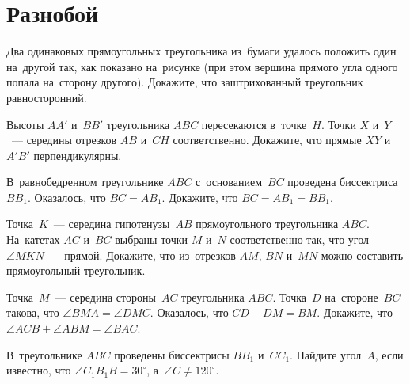 
\section*{Разнобой}


\begin{problems}

\item
Два одинаковых прямоугольных треугольника из~бумаги удалось положить один
на~другой так, как показано на~рисунке (при этом вершина прямого угла одного
попала на~сторону другого).
Докажите, что заштрихованный треугольник равносторонний.
\begin{center}
\end{center}

\item
Высоты $AA'$ и~$BB'$ треугольника $ABC$ пересекаются в~точке~$H$.
Точки $X$ и~$Y$~--- середины отрезков $AB$ и~$CH$ соответственно.
Докажите, что прямые $XY$ и~$A'B'$ перпендикулярны.

\item
В~равнобедренном треугольнике $ABC$ с~основанием~$BC$ проведена
биссектриса~$B B_1$.
Оказалось, что $B C = A B_1$.
Докажите, что $B C = A B_1 = B B_1$.

\item
Точка~$K$~--- середина гипотенузы~$AB$ прямоугольного треугольника $ABC$.
На~катетах $AC$ и~$BC$ выбраны точки $M$ и~$N$ соответственно так, что угол
$\angle MKN$~--- прямой.
Докажите, что из~отрезков $AM$, $BN$ и~$MN$ можно составить прямоугольный
треугольник.

\item
Точка~$M$~--- середина стороны~$AC$ треугольника $ABC$.
Точка~$D$ на~стороне~$BC$ такова, что $\angle BMA = \angle DMC$.
Оказалось, что $CD + DM = BM$.
Докажите, что $\angle ACB + \angle ABM = \angle BAC$.

\item
В~треугольнике $ABC$ проведены биссектрисы $B B_1$ и~$C C_1$.
Найдите угол~$A$, если известно, что $\angle C_1 B_1 B = 30^{\circ}$,
а~$\angle C \neq 120^{\circ}$.

\end{problems}

